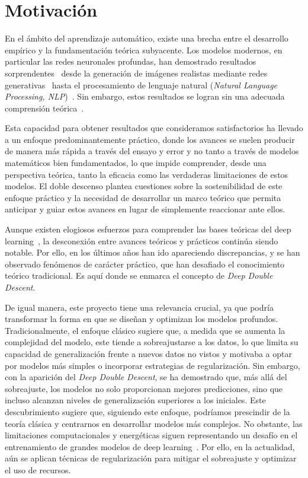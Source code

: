 \section{Motivación}

En el ámbito del aprendizaje automático, existe una brecha entre el desarrollo empírico y la fundamentación teórica subyacente. Los modelos modernos, en particular las redes neuronales profundas, han demostrado resultados sorprendentes~\cite{Sejnowski2020TheUE, He2020RecentAI} desde la generación de imágenes realistas mediante redes generativas~\cite{Elasri2022, Ruthotto2021} hasta el procesamiento de lenguaje natural (\textit{Natural Language Processing, NLP})~\cite{Kamath2019, Lauriola2022}. Sin embargo, estos resultados se logran sin una adecuada comprensión teórica~\cite{Ben-David2009, Grohs2022}.

Esta capacidad para obtener resultados que consideramos satisfactorios ha llevado a un enfoque predominantemente práctico, donde los avances se suelen producir de manera más rápida a través del ensayo y error y no tanto a través de modelos matemáticos bien fundamentados, lo que impide comprender, desde una perspectiva teórica, tanto la eficacia como las verdaderas limitaciones de estos modelos. El doble descenso plantea cuestiones sobre la sostenibilidad de este enfoque práctico y la necesidad de desarrollar un marco teórico que permita anticipar y guiar estos avances en lugar de simplemente reaccionar ante ellos.

Aunque existen elogiosos esfuerzos para comprender las bases teóricas del deep learning~\cite{Zhang2021,Mallat2016, Prince2023, Bishop2023, Grohs2022, Balestriero2018, Michael2018}, la desconexión entre avances teóricos y prácticos continúa siendo notable. Por ello, en los últimos años han ido apareciendo discrepancias, y se han observado fenómenos de carácter práctico, que han desafiado el conocimiento teórico tradicional. Es aquí donde se enmarca el concepto de \emph{Deep Double Descent}.

De igual manera, este proyecto tiene una relevancia crucial, ya que podría transformar la forma en que se diseñan y optimizan los modelos profundos. Tradicionalmente, el enfoque clásico sugiere que, a medida que se aumenta la complejidad del modelo, este tiende a sobreajustarse a los datos, lo que limita su capacidad de generalización frente a nuevos datos no vistos y motivaba a optar por modelos más simples o incorporar estrategias de regularización. Sin embargo, con la aparición del \textit{Deep Double Descent}, se ha demostrado que, más allá del sobreajuste, los modelos no solo proporcionan mejores predicciones, sino que incluso alcanzan niveles de generalización superiores a los iniciales. Este descubrimiento sugiere que, siguiendo este enfoque, podríamos prescindir de la teoría clásica y centrarnos en desarrollar modelos más complejos. No obstante, las limitaciones computacionales y energéticas siguen representando un desafío en el entrenamiento de grandes modelos de deep learning~\cite{Thompson2022, Cottier2025, Desislavov2023, Strubell2020}. Por ello, en la actualidad, aún se aplican técnicas de regularización para mitigar el sobreajuste y optimizar el uso de recursos.

